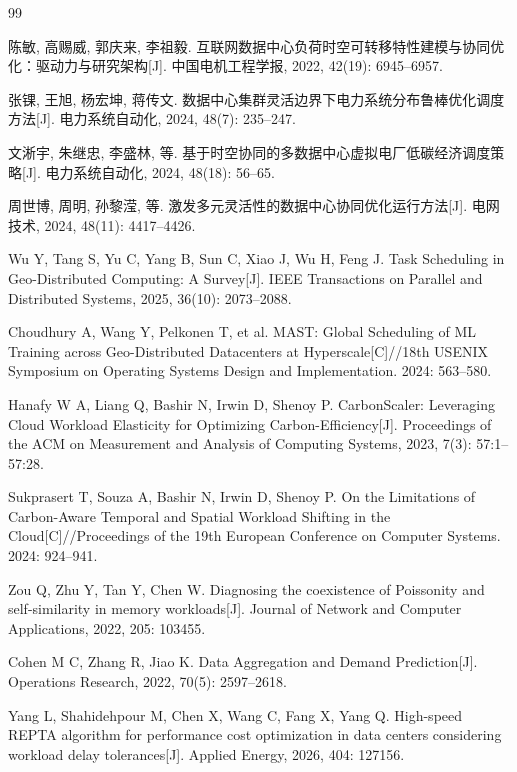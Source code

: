 \begingroup
\footnotesize
\begin{thebibliography}{99}
\setlength{\itemsep}{0.15em}

陈敏, 高赐威, 郭庆来, 李祖毅. 互联网数据中心负荷时空可转移特性建模与协同优化：驱动力与研究架构[J]. 中国电机工程学报, 2022, 42(19): 6945--6957.

张锞, 王旭, 杨宏坤, 蒋传文. 数据中心集群灵活边界下电力系统分布鲁棒优化调度方法[J]. 电力系统自动化, 2024, 48(7): 235--247.

文淅宇, 朱继忠, 李盛林, 等. 基于时空协同的多数据中心虚拟电厂低碳经济调度策略[J]. 电力系统自动化, 2024, 48(18): 56--65.

周世博, 周明, 孙黎滢, 等. 激发多元灵活性的数据中心协同优化运行方法[J]. 电网技术, 2024, 48(11): 4417--4426.

Wu Y, Tang S, Yu C, Yang B, Sun C, Xiao J, Wu H, Feng J. Task Scheduling in Geo-Distributed Computing: A Survey[J]. IEEE Transactions on Parallel and Distributed Systems, 2025, 36(10): 2073--2088.

Choudhury A, Wang Y, Pelkonen T, et al. MAST: Global Scheduling of ML Training across Geo-Distributed Datacenters at Hyperscale[C]//18th USENIX Symposium on Operating Systems Design and Implementation. 2024: 563--580.

Hanafy W A, Liang Q, Bashir N, Irwin D, Shenoy P. CarbonScaler: Leveraging Cloud Workload Elasticity for Optimizing Carbon-Efficiency[J]. Proceedings of the ACM on Measurement and Analysis of Computing Systems, 2023, 7(3): 57:1--57:28.

Sukprasert T, Souza A, Bashir N, Irwin D, Shenoy P. On the Limitations of Carbon-Aware Temporal and Spatial Workload Shifting in the Cloud[C]//Proceedings of the 19th European Conference on Computer Systems. 2024: 924--941.

Zou Q, Zhu Y, Tan Y, Chen W. Diagnosing the coexistence of Poissonity and self-similarity in memory workloads[J]. Journal of Network and Computer Applications, 2022, 205: 103455.

Cohen M C, Zhang R, Jiao K. Data Aggregation and Demand Prediction[J]. Operations Research, 2022, 70(5): 2597--2618.

Yang L, Shahidehpour M, Chen X, Wang C, Fang X, Yang Q. High-speed REPTA algorithm for performance cost optimization in data centers considering workload delay tolerances[J]. Applied Energy, 2026, 404: 127156.


\end{thebibliography}
